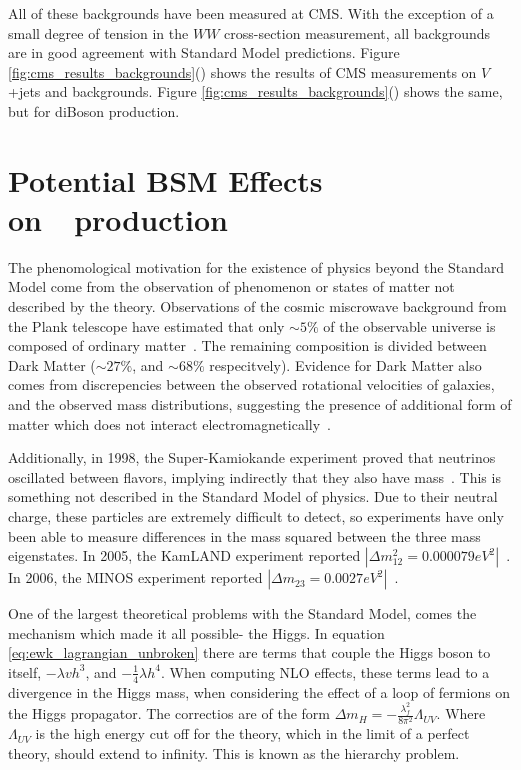 \par All of these backgrounds have been measured at CMS.  With the
exception of a small degree of tension in the $WW$ cross-section
measurement, all backgrounds are in good agreement with Standard Model
predictions.  Figure
\ref{fig:cms_results_backgrounds}()
shows the results of CMS measurements on $V$+jets and \ttjets
backgrounds.  Figure
\ref{fig:cms_results_backgrounds}() shows
the same, but for diBoson production.  
 

\section{Potential BSM Effects on~\ttH~production}
\label{bsm_effects_overview}

\par The phenomological motivation for the existence of physics beyond
the Standard Model come from the observation of phenomenon or states
of matter not described by the theory.  Observations of the cosmic miscrowave background
from the Plank telescope have estimated that only $\sim5\%$ of the
observable universe is composed of ordinary
matter~\cite{BSM_Planck}. The remaining composition is divided between  
Dark Matter ($\sim27\%$, and $\sim68\%$ respecitvely).  Evidence for
Dark Matter also comes from discrepencies between the observed
rotational velocities of galaxies, and the observed mass
distributions, suggesting the presence of additional form of matter
which does not interact
electromagnetically~\cite{BSM_Rubin_DM_GalaxyRotations}.

\par Additionally, in 1998, the Super-Kamiokande experiment proved that
neutrinos oscillated between flavors, implying indirectly that they
also have mass~\cite{BSM_superK}.  This is something not described in
the Standard Model of physics.  Due to their neutral charge, these
particles  are extremely difficult to detect, so experiments have only
been able to measure differences in the mass squared between the three
mass eigenstates.  In 2005, the KamLAND experiment reported
$|{\Delta}m^{2}_{12}=0.000079
eV^{2}|$~\cite{BSM_neutrinoDeltaM12_kamland}.  In 2006, the MINOS
experiment reported
$|{\Delta}m_{23}=0.0027 eV^{2}|$~\cite{BSM_neutrinoDeltaM23_minos}.

\par One of the largest theoretical problems with the Standard Model,
comes the mechanism which made it all possible- the Higgs.  In
equation \ref{eq:ewk_lagrangian_unbroken} there are terms that couple
the Higgs boson to itself, $-{\lambda}vh^{3}$, and
$-\frac{1}{4}{\lambda}h^{4}$.  When computing NLO effects, these terms
lead to a divergence in the Higgs mass, when considering the effect of
a loop of fermions on the Higgs propagator.  The correctios are of the form ${\Delta}m_{H} =
-\frac{\lambda_{f}^{2}}{8\pi^{2}}\Lambda_{UV}$.  Where $\Lambda_{UV}$
is the high energy cut off for the theory, which in the limit of a
perfect theory, should extend to infinity.  This is known as the
hierarchy problem.  

